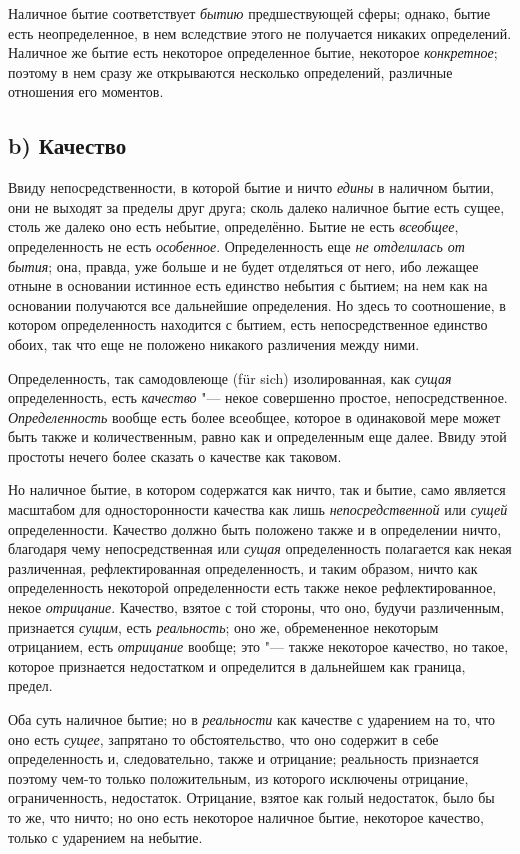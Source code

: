 Наличное бытие соответствует {\em бытию} предшествующей
сферы; однако, бытие есть неопределенное, в нем вследствие этого не
получается никаких определений. Наличное же бытие есть некоторое
определенное бытие, некоторое {\em конкретное}; поэтому
в нем сразу же открываются несколько определений, различные отношения его
моментов.

\subsection[b) Качество]{b) Качество}
Ввиду непосредственности, в которой бытие и ничто
{\em едины} в наличном бытии, они не выходят за пределы
друг друга; сколь далеко наличное бытие есть сущее, столь же далеко оно
есть небытие, определённо. Бытие не есть {\em всеобщее},
определенность не есть {\em особенное}. Определенность
еще {\em не отделилась от бытия}; она, правда, уже
больше и не будет отделяться от него, ибо лежащее отныне в основании
истинное есть единство небытия с бытием; на нем как на основании получаются
все дальнейшие определения. Но здесь то соотношение, в котором
определенность находится с бытием, есть непосредственное единство обоих,
так что еще не положено никакого различения между ними.

Определенность, так самодовлеюще (für sich) изолированная, как
{\em сущая} определенность, есть
{\em качество} "--- некое совершенно простое,
непосредственное. {\em Определенность} вообще есть
более всеобщее, которое в одинаковой мере может быть также и
количественным, равно как и определенным еще далее. Ввиду этой простоты
нечего более сказать о качестве как таковом.

Но наличное бытие, в котором содержатся как ничто, так и бытие, само
является масштабом для односторонности качества как лишь
{\em непосредственной} или
{\em сущей} определенности. Качество должно быть
положено также и в определении ничто, благодаря чему непосредственная или
{\em сущая} определенность полагается как некая
различенная, рефлектированная определенность, и таким образом, ничто как
определенность некоторой определенности есть также некое рефлектированное,
некое {\em отрицание}. Качество, взятое с той стороны,
что оно, будучи различенным, признается {\em сущим},
есть {\em реальность}; оно же, обремененное некоторым
отрицанием, есть {\em отрицание} вообще; это "--- также
некоторое качество, но такое, которое признается недостатком и определится
в дальнейшем как граница, предел.

Оба суть наличное бытие; но в {\em реальности} как
качестве с ударением на то, что оно есть {\em сущее},
запрятано то обстоятельство, что оно содержит в себе определенность и,
следовательно, также и отрицание; реальность признается поэтому чем-то
только положительным, из которого исключены отрицание, ограниченность,
недостаток. Отрицание, взятое как голый недостаток, было бы то же, что
ничто; но оно есть некоторое наличное бытие, некоторое качество, только с
ударением на небытие.

